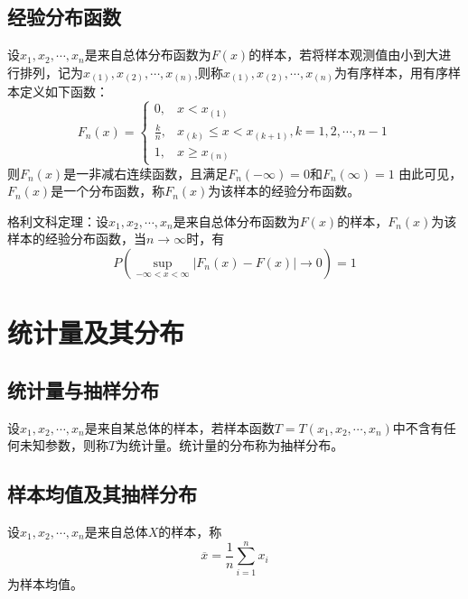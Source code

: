 \subsection{经验分布函数}
\begin{definition}
    设$x_1,x_2,\cdots,x_n$是来自总体分布函数为$F(x)$的样本，若将样本观测值由小到大进行排列，记为$x_{(1)}, x_{(2)}, \cdots , x_{(n)}$,则称$x_{(1)}, x_{(2)}, \cdots , x_{(n)}$为有序样本，用有序样本定义如下函数：
    $$
        F_n(x)=\left\{
        \begin{array}{ll}
            0,           & x<x_{(1)}                                 \\
            \frac{k}{n}, & x_{(k)}\leq x<x_{(k+1)}, k=1,2,\cdots,n-1 \\
            1,           & x\geq x_{(n)}
        \end{array}
        \right.
    $$
    则$F_n(x)$是一非减右连续函数，且满足$F_n(- \infty)=0$和$F_n(\infty)=1$
    由此可见，$F_n(x)$是一个分布函数，称$F_n(x)$为该样本的经验分布函数。
\end{definition}

\begin{theorem}
    格利文科定理：设$x_1,x_2,\cdots,x_n$是来自总体分布函数为$F(x)$的样本，$F_n(x)$为该样本的经验分布函数，当$n\rightarrow \infty$时，有
    $$
        P\left( \sup\limits_{-\infty < x < \infty} |F_n(x)-F(x)| \to 0 \right) =1
    $$
\end{theorem}

\section{统计量及其分布}
\subsection{统计量与抽样分布}
\begin{definition}
    设$x_1,x_2,\cdots,x_n$是来自某总体的样本，若样本函数$T=T(x_1 , x_2 , \cdots , x_n)$中不含有任何未知参数，则称$T$为统计量。统计量的分布称为抽样分布。
\end{definition}

\subsection{样本均值及其抽样分布}
\begin{definition}
    设$x_1,x_2,\cdots,x_n$是来自总体$X$的样本，称
    $$
        \overline{x}=\frac{1}{n}\sum\limits_{i=1}^n x_i
    $$
    为样本均值。
\end{definition}

